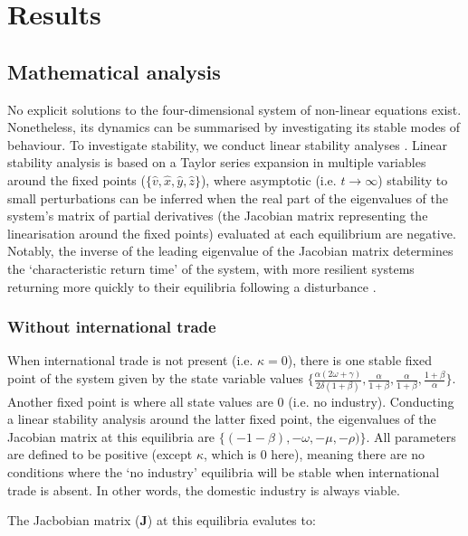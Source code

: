 \documentclass[12pt]{article}
\begin{document}
\section{Results}

\subsection{Mathematical analysis}
No explicit solutions to the four-dimensional system of non-linear equations exist. Nonetheless, its dynamics can be summarised by investigating its stable modes of behaviour. To investigate stability, we conduct linear stability analyses \cite{strogatz1994}. Linear stability analysis is based on a Taylor series expansion in multiple variables around the fixed points ($\{\hat{v}, \hat{x}, \hat{y}, \hat{z}\}$), where asymptotic (i.e. $t \rightarrow \infty$) stability to small perturbations can be inferred when the real part of the eigenvalues of the system's matrix of partial derivatives (the Jacobian matrix representing the linearisation around the fixed points) evaluated at each equilibrium are negative. Notably, the inverse of the leading eigenvalue of the Jacobian matrix determines the `characteristic return time' of the system, with more resilient systems returning more quickly to their equilibria following a disturbance \cite{pimm1984}.

\subsubsection{Without international trade}
When international trade is not present (i.e. $\kappa = 0$), there is one stable fixed point of the system given by the state variable values $\big \{\frac{\alpha(2\omega + \gamma)}{2 \delta (1 + \beta)}, \frac{\alpha}{1 + \beta}, \frac{\alpha}{1 + \beta}, \frac{1 + \beta}{\alpha}\big\}$. Another fixed point is where all state values are 0 (i.e. no industry). Conducting a linear stability analysis around the latter fixed point, the eigenvalues of the Jacobian matrix at this equilibria are $\{(-1 - \beta), - \omega, - \mu, - \rho)\}$. All parameters are defined to be positive (except $\kappa$, which is $0$ here), meaning there are no conditions where the `no industry' equilibria will be stable when international trade is absent. In other words, the domestic industry is always viable.

\iffalse
The Jacbobian matrix ($\boldsymbol{J}$) at this equilibria evalutes to:
\end{document}
